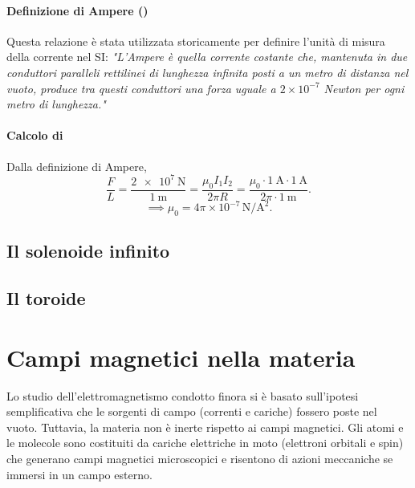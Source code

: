 \documentclass[a4paper,11pt]{report}
\begin{document}
\begin{approfondimento}[colback= white, colframe=green!35!black, no shadow, title={Definizione di Ampere e calcolo di \texorpdfstring{$\bm{\mu_0}$}{mu zero}}]

\subsubsection{Definizione di Ampere (\bm{$=[A]$})}
    Questa relazione è stata utilizzata storicamente per definire l'unità di misura della corrente nel SI:
    \textit{"L'Ampere è quella corrente costante che, mantenuta in due conduttori paralleli rettilinei di lunghezza infinita posti a un metro di distanza nel vuoto, produce tra questi conduttori una forza uguale a $2 \times 10^{-7}$ Newton per ogni metro di lunghezza."}\\
    \subsubsection{Calcolo di }
   Dalla definizione di Ampere, 
\begin{equation}
    \frac{F}{L} = \frac{\SI{2e7}{\newton}}{\SI{1}{\meter}} = \frac{\mu_0 I_1 I_2}{2\pi R} = \frac{\mu_0 \cdot \SI{1}{\ampere} \cdot \SI{1}{\ampere}}{2\pi \cdot \SI{1}{\meter}}.
\end{equation}
\begin{equation}
   \implies \mu_0 = 4\pi \times 10^{-7} \, \si{\newton\per\ampere\squared}.
\end{equation}
\end{approfondimento}

\section{Il solenoide infinito}

\section{Il toroide}

\chapter{Campi magnetici nella materia}

Lo studio dell'elettromagnetismo condotto finora si è basato sull'ipotesi semplificativa che le sorgenti di campo (correnti e cariche) fossero poste nel vuoto.
Tuttavia, la materia non è inerte rispetto ai campi magnetici. Gli atomi e le molecole sono costituiti da cariche elettriche in moto (elettroni orbitali e spin) che generano campi magnetici microscopici e risentono di azioni meccaniche se immersi in un campo esterno.
\end{document}
